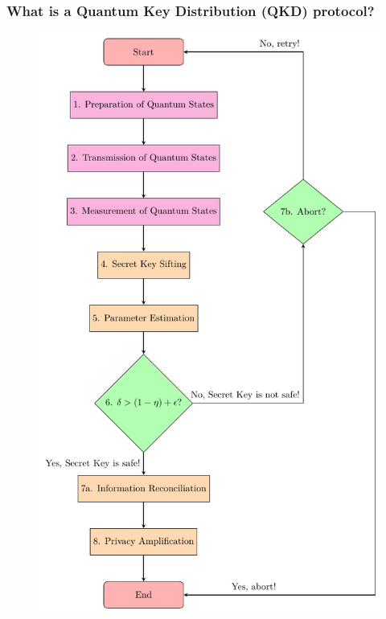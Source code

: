 \documentclass{beamer}
\begin{document}
		\begin{frame}
			\frametitle{\large What is a Quantum Key Distribution (QKD) protocol?}

            \vspace{4ex}
            \begin{figure}
                \centering
                \begin{minipage}{0.4\textwidth}
                    \centering
                    \includegraphics[width=1.0\linewidth, height=0.75\textheight]{figures/pdf/qkd-protocol-flowchart.pdf}
                    \vspace{-4ex}

\end{minipage}
\end{figure}
\end{frame}
\end{document}
